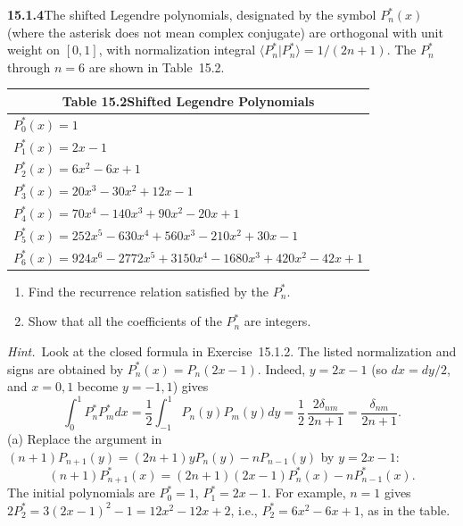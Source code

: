 \par\bigskip
\noindent\textbf{15.1.4}\quad The shifted Legendre polynomials,
designated by the symbol $P_{n}^{*}(x)$ (where the asterisk does not
mean complex conjugate) are orthogonal with unit weight on $[0,1]$,
with normalization integral
$\langle P_{n}^{*}|P_{n}^{*}\rangle=1/(2n+1)$. The $P_{n}^{*}$ through
$n=6$ are shown in Table~15.2.
\begin{center}
\begin{tabular}{l}
\multicolumn{1}{c}{Table 15.2\quad Shifted Legendre Polynomials}\\[4pt]
\toprule
$P_{0}^{*}(x)=1$\\
$P_{1}^{*}(x)=2x-1$\\
$P_{2}^{*}(x)=6x^{2}-6x+1$\\
$P_{3}^{*}(x)=20x^{3}-30x^{2}+12x-1$\\
$P_{4}^{*}(x)=70x^{4}-140x^{3}+90x^{2}-20x+1$\\
$P_{5}^{*}(x)=252x^{5}-630x^{4}+560x^{3}-210x^{2}+30x-1$\\
$P_{6}^{*}(x)=924x^{6}-2772x^{5}+3150x^{4}-1680x^{3}+420x^{2}-42x+1$\\
\bottomrule
\end{tabular}
\end{center}
\begin{enumerate}
\item[(a)] Find the recurrence relation satisfied by the $P_{n}^{*}$.
\item[(b)] Show that all the coefficients of the $P_{n}^{*}$ are
integers.
\end{enumerate}
\par\emph{Hint.}~Look at the closed formula in Exercise~15.1.2.
\solution
The listed normalization and signs are obtained by
$P_n^*(x)=P_n(2x-1)$. Indeed, $y=2x-1$ (so $dx=dy/2$, and $x=0,1$
become $y=-1,1$) gives
\[
\int_0^1P_n^*P_m^*dx
=\frac12\int_{-1}^1P_n(y)P_m(y)dy
=\frac12\,\frac{2\delta_{nm}}{2n+1}
=\frac{\delta_{nm}}{2n+1}.
\]
(a) Replace the argument in
$(n+1)P_{n+1}(y)=(2n+1)yP_n(y)-nP_{n-1}(y)$ by $y=2x-1$:
\[
\boxed{(n+1)P_{n+1}^*(x)
=(2n+1)(2x-1)P_n^*(x)-nP_{n-1}^*(x)}.
\]
The initial polynomials are $P_0^*=1$, $P_1^*=2x-1$. For example,
$n=1$ gives $2P_2^*=3(2x-1)^2-1=12x^2-12x+2$, i.e.,
$P_2^*=6x^2-6x+1$, as in the table.

